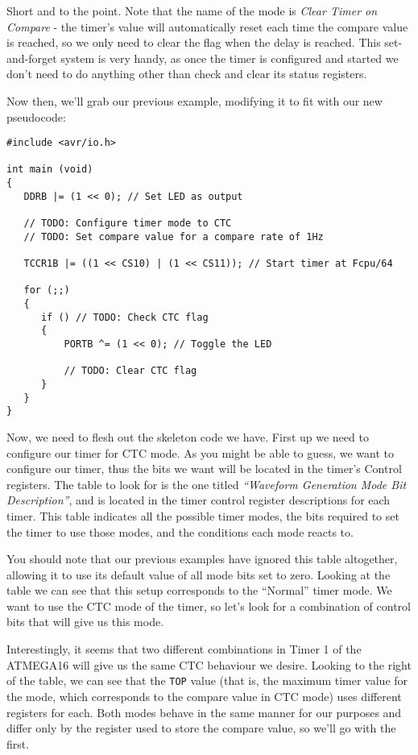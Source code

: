 \documentclass[a4paper,oneside,notitlepage]{book}
\begin{document}
Short and to the point. Note that the name of the mode is \textit{Clear Timer on Compare} - the timer's value will automatically reset each time the compare value is reached, so we only need to clear the flag when the delay is reached. This set-and-forget system is very handy, as once the timer is configured and started we don't need to do anything other than check and clear its status registers.

Now then, we'll grab our previous example, modifying it to fit with our new pseudocode:

\begin{center}
\begin{lstlisting}
#include <avr/io.h>

int main (void)
{
   DDRB |= (1 << 0); // Set LED as output

   // TODO: Configure timer mode to CTC
   // TODO: Set compare value for a compare rate of 1Hz

   TCCR1B |= ((1 << CS10) | (1 << CS11)); // Start timer at Fcpu/64

   for (;;)
   {
      if () // TODO: Check CTC flag
      {
          PORTB ^= (1 << 0); // Toggle the LED

          // TODO: Clear CTC flag
      }
   }
}
\end{lstlisting}
\end{center}

Now, we need to flesh out the skeleton code we have. First up we need to configure our timer for CTC mode. As you might be able to guess, we want to configure our timer, thus the bits we want will be located in the timer's Control registers. The table to look for is the one titled \emph{``Waveform Generation Mode Bit Description''}, and is located in the timer control register descriptions for each timer. This table indicates all the possible timer modes, the bits required to set the timer to use those modes, and the conditions each mode reacts to.

You should note that our previous examples have ignored this table altogether, allowing it to use its default value of all mode bits set to zero. Looking at the table we can see that this setup corresponds to the ``Normal'' timer mode. We want to use the CTC mode of the timer, so let's look for a combination of control bits that will give us this mode.

Interestingly, it seems that two different combinations in Timer 1 of the ATMEGA16 will give us the same CTC behaviour we desire. Looking to the right of the table, we can see that the \texttt{TOP} value (that is, the maximum timer value for the mode, which corresponds to the compare value in CTC mode) uses different registers for each. Both modes behave in the same manner for our purposes and differ only by the register used to store the compare value, so we'll go with the first.
\end{document}
